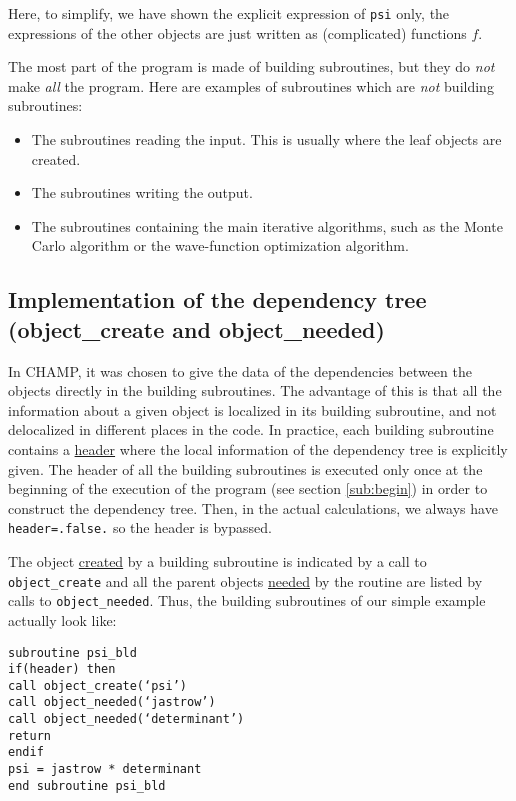 \documentclass[letter,11pt]{article}
\newcommand\Def[1]{\underline{#1}}
\begin{document}
\vspace{0.5cm}
\noindent
Here, to simplify, we have shown the explicit expression of {\tt psi} only, the expressions of the other objects are just written as (complicated) functions $f$.

\vspace{0.5cm}
The most part of the program is made of building subroutines, but they do {\it not} make {\it all} the program. Here are examples of subroutines which are {\it not} building subroutines:
\begin{itemize}
\item The subroutines reading the input. This is usually where the leaf objects are created.
\item The subroutines writing the output.
\item The subroutines containing the main iterative algorithms, such as the Monte Carlo algorithm or the wave-function optimization algorithm.
\end{itemize}

\subsection{Implementation of the dependency tree (object_create and object_needed)}

In CHAMP, it was chosen to give the data of the dependencies between the objects directly in the building subroutines. The advantage of this is that all the information about a given object is localized in its building subroutine, and not delocalized in different places in the code.
In practice, each building subroutine contains a \Def{header} where the local information of the dependency tree is explicitly given.
The header of all the building subroutines is executed only once at the beginning of the execution of the program (see section \ref{sub:begin}) in order to construct the dependency tree. Then, in the actual calculations, we always have {\tt header=.false.} so the header is bypassed.

The object \Def{created} by a building subroutine is indicated by a call to {\tt object_create} and all the parent objects \Def{needed} by the routine are listed by calls to {\tt object_needed}.
Thus, the building subroutines of our simple example actually look like:

\vspace{0.5cm}
\noindent
{\tt subroutine psi_bld\\
if(header) then\\
\phantom{xx} call object_create(`psi')\\
\phantom{xx} call object_needed(`jastrow')\\
\phantom{xx} call object_needed(`determinant')\\
\phantom{xx} return\\
endif\\
psi = jastrow * determinant\\
end subroutine psi_bld}
\end{document}
